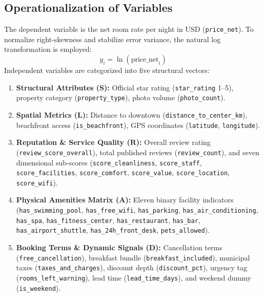 \documentclass[11pt,a4paper]{article}
\begin{document}
\subsection{Operationalization of Variables}
The dependent variable is the net room rate per night in USD (\texttt{price\_net}). To normalize right-skewness and stabilize error variance, the natural log transformation is employed:
\begin{equation}
y_i = \ln(\text{price\_net}_i)
\end{equation}
Independent variables are categorized into five structural vectors:
\begin{enumerate}[leftmargin=*]
    \item \textbf{Structural Attributes ($\mathbf{S}$):} Official star rating (\texttt{star\_rating} 1--5), property category (\texttt{property\_type}), photo volume (\texttt{photo\_count}).
    \item \textbf{Spatial Metrics ($\mathbf{L}$):} Distance to downtown (\texttt{distance\_to\_center\_km}), beachfront access (\texttt{is\_beachfront}), GPS coordinates (\texttt{latitude}, \texttt{longitude}).
    \item \textbf{Reputation \& Service Quality ($\mathbf{R}$):} Overall review rating (\texttt{review\_score\_overall}), total published reviews (\texttt{review\_count}), and seven dimensional sub-scores (\texttt{score\_cleanliness}, \texttt{score\_staff}, \texttt{score\_facilities}, \texttt{score\_comfort}, \texttt{score\_value}, \texttt{score\_location}, \texttt{score\_wifi}).
    \item \textbf{Physical Amenities Matrix ($\mathbf{A}$):} Eleven binary facility indicators (\texttt{has\_swimming\_pool}, \texttt{has\_free\_wifi}, \texttt{has\_parking}, \texttt{has\_air\_conditioning}, \texttt{has\_spa}, \texttt{has\_fitness\_center}, \texttt{has\_restaurant}, \texttt{has\_bar}, \texttt{has\_airport\_shuttle}, \texttt{has\_24h\_front\_desk}, \texttt{pets\_allowed}).
    \item \textbf{Booking Terms \& Dynamic Signals ($\mathbf{D}$):} Cancellation terms (\texttt{free\_cancellation}), breakfast bundle (\texttt{breakfast\_included}), municipal taxes (\texttt{taxes\_and\_charges}), discount depth (\texttt{discount\_pct}), urgency tag (\texttt{rooms\_left\_warning}), lead time (\texttt{lead\_time\_days}), and weekend dummy (\texttt{is\_weekend}).
\end{enumerate}
\end{document}
